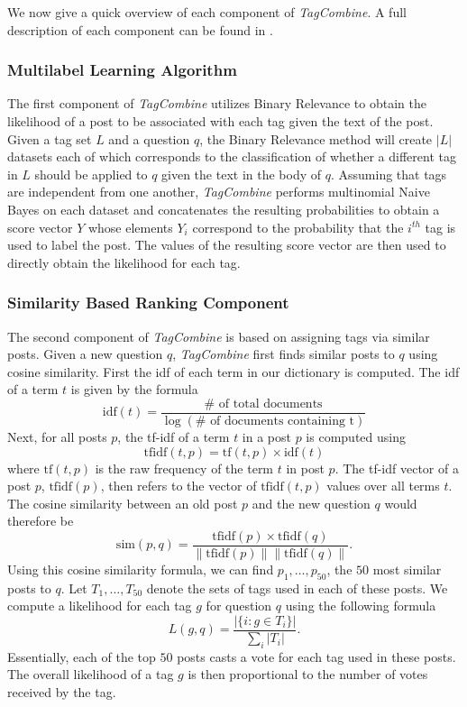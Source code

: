\documentclass[10pt]{IEEEtran}
\begin{document}
We now give a quick overview of each component of \textit{TagCombine}. A full description of each component can be found in \cite{1}.

\subsubsection{Multilabel Learning Algorithm}

The first component of \textit{TagCombine} utilizes Binary Relevance to obtain the likelihood of a post to be associated with each tag given the text of the post. Given a tag set $L$ and a question $q$, the Binary Relevance method will create $|L|$ datasets each of which corresponds to the classification of whether a different tag in $L$ should be applied to $q$ given the text in the body of $q$. Assuming that tags are independent from one another, \textit{TagCombine} performs multinomial Naive Bayes on each dataset and concatenates the resulting probabilities to obtain a score vector $Y$ whose elements $Y_i$ correspond to the probability that the $i^{th}$ tag is used to label the post. The values of the resulting score vector are then used to directly obtain the likelihood for each tag.

\subsubsection{Similarity Based Ranking Component}

The second component of \textit{TagCombine} is based on assigning tags via similar posts. Given a new question $q$, \textit{TagCombine} first finds similar posts to $q$ using cosine similarity. First the idf of each term in our dictionary is computed. The idf of a term $t$ is given by the formula
\[ \text{idf}(t) = \frac{\# \text{ of total documents}}{\log (\# \text{ of documents containing t} )} \]
Next, for all posts $p$, the tf-idf of a term $t$ in a post $p$ is computed using
\[ \text{tfidf}(t,p) = \text{tf}(t, p) \times \text{idf}(t)\]
where $\text{tf}(t, p)$ is the raw frequency of the term $t$ in post $p$. The tf-idf vector of a post $p$, $\text{tfidf}(p)$, then refers to the vector of $\text{tfidf}(t,p)$ values over all terms $t$. The cosine similarity between an old post $p$ and the new question $q$ would therefore be
\[ \text{sim}(p, q) = \frac{\text{tfidf}(p) \times \text{tfidf}(q)}{\|\text{tfidf}(p)\| \|\text{tfidf}(q)\|}.\]
Using this cosine similarity formula, we can find $p_1, \ldots, p_{50}$, the $50$ most similar posts to $q$. Let $T_1, \ldots, T_{50}$ denote the sets of tags used in each of these posts. We compute a likelihood for each tag $g$ for question $q$ using the following formula
\[ L(g, q) = \frac{ |\{i : g \in T_i \} | }{\sum_i  |T_i |}. \]
Essentially, each of the top $50$ posts casts a vote for each tag used in these posts. The overall likelihood of a tag $g$ is then proportional to the number of votes received by the tag.
\end{document}
